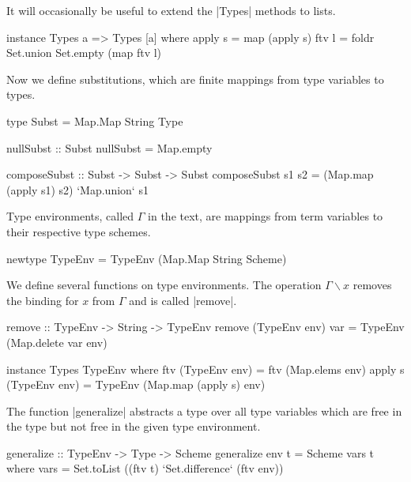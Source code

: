 \documentclass[a4paper,11pt]{article}
\begin{document}
It will occasionally be useful to extend the |Types| methods to lists.
\begin{code}
instance Types a => Types [a] where
    apply s  =  map (apply s)
    ftv l    =  foldr Set.union Set.empty (map ftv l)
\end{code}
%
Now we define substitutions, which are finite mappings from type
variables to types.
%
\begin{code}
type Subst = Map.Map String Type

nullSubst  ::  Subst
nullSubst  =   Map.empty

composeSubst         :: Subst -> Subst -> Subst
composeSubst s1 s2   = (Map.map (apply s1) s2) `Map.union` s1
\end{code}
%
Type environments, called $\Gamma$ in the text, are mappings from term
variables to their respective type schemes.
%
\begin{code}
newtype TypeEnv = TypeEnv (Map.Map String Scheme)
\end{code}
%
We define several functions on type environments.  The operation
$\Gamma\backslash x$ removes the binding for $x$ from $\Gamma$ and is
called |remove|.
%
\begin{code}
remove                    ::  TypeEnv -> String -> TypeEnv
remove (TypeEnv env) var  =  TypeEnv (Map.delete var env)

instance Types TypeEnv where
    ftv (TypeEnv env)      =  ftv (Map.elems env)
    apply s (TypeEnv env)  =  TypeEnv (Map.map (apply s) env)
\end{code}
%
The function |generalize| abstracts a type over all type variables
which are free in the type but not free in the given type environment.
%
\begin{code}
generalize        ::  TypeEnv -> Type -> Scheme
generalize env t  =   Scheme vars t
  where vars = Set.toList ((ftv t) `Set.difference` (ftv env))
\end{code}
\end{document}
